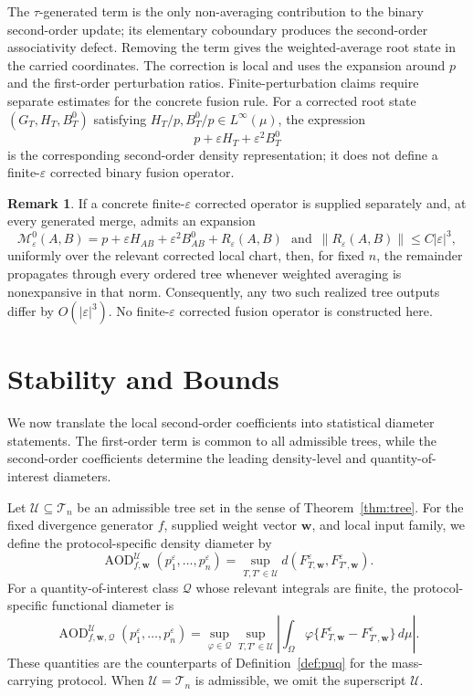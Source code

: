 \documentclass[11pt]{article}
\theoremstyle{plain}
\theoremstyle{definition}
\newtheorem{remark}{Remark}
\theoremstyle{definition}
\newcommand{\BT}{\mathcal T}
\newcommand{\AOD}{\operatorname{AOD}}
\newcommand{\eps}{\varepsilon}
\newcommand{\QoI}{\mathcal Q}
\newcommand{\wv}{\mathbf w}
\newcommand{\Fw}[1]{F_{#1,\wv}^{\eps}}
\newcommand{\AODfw}{\AOD_{f,\wv}}
\newcommand{\AODfwQ}{\AOD_{f,\wv,\QoI}}
\begin{document}
The $\tau$-generated term is the only non-averaging contribution to the binary second-order update; its elementary coboundary produces the second-order associativity defect. Removing the term gives the weighted-average root state in the carried coordinates. The correction is local and uses the expansion around $p$ and the first-order perturbation ratios. Finite-perturbation claims require separate estimates for the concrete fusion rule. For a corrected root state $(G_T,H_T,B_T^0)$ satisfying $H_T/p,B_T^0/p\in L^\infty(\mu)$, the expression
\[
p+\eps H_T+\eps^2B_T^0
\]
is the corresponding second-order density representation; it does not define a finite-$\eps$ corrected binary fusion operator.

\begin{remark}
If a concrete finite-$\eps$ corrected operator is supplied separately and, at every generated merge, admits an expansion
\[
\mathcal M_\eps^0(A,B)=p+\eps H_{AB}+\eps^2B_{AB}^0+R_\eps(A,B)\,\,\,\,\text{and}\,\,\,
\|R_\eps(A,B)\|\le C|\eps|^3,
\]
uniformly over the relevant corrected local chart, then, for fixed $n$, the remainder propagates through every ordered tree whenever weighted averaging is nonexpansive in that norm. Consequently, any two such realized tree outputs differ by $O(|\eps|^3)$. No finite-$\eps$ corrected fusion operator is constructed here.
\end{remark}



\section{Stability and Bounds}\label{sec:bounds}

We now translate the local second-order coefficients into statistical diameter statements. The first-order term is common to all admissible trees, while the second-order coefficients determine the leading density-level and quantity-of-interest diameters.


Let $\mathcal U\subseteq\BT_n$ be an admissible tree set in the sense of Theorem~\ref{thm:tree}. For the fixed divergence generator $f$, supplied weight vector $\wv$, and local input family, we define the protocol-specific density diameter by
\[
\AODfw^{\mathcal U}(p_1^\eps,\ldots,p_n^\eps)
=\sup_{T,T'\in\mathcal U}d(\Fw{T},\Fw{T'}).
\]
For a quantity-of-interest class $\QoI$ whose relevant integrals are finite, the protocol-specific functional diameter is
\[
\AODfwQ^{\mathcal U}(p_1^\eps,\ldots,p_n^\eps)
=\sup_{\varphi\in\QoI}\sup_{T,T'\in\mathcal U}
\left|\int_\Omega\varphi\{\Fw{T}-\Fw{T'}\}\,d\mu\right|.
\]
These quantities are the counterparts of Definition~\ref{def:puq} for the mass-carrying protocol. When $\mathcal U=\BT_n$ is admissible, we omit the superscript $\mathcal U$.
\end{document}
